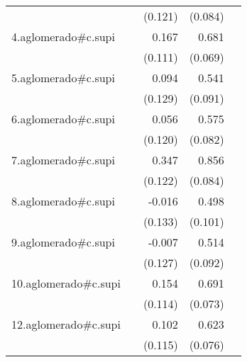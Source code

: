 {\begin{longtable}{l*{4}{D{.}{.}{-1}}}
            &                     &     (0.121)         &     (0.084)         &                     \\
\addlinespace
4.aglomerado#c.supi&                     &       0.167         &       0.681\sym{***}&                     \\
            &                     &     (0.111)         &     (0.069)         &                     \\
\addlinespace
5.aglomerado#c.supi&                     &       0.094         &       0.541\sym{***}&                     \\
            &                     &     (0.129)         &     (0.091)         &                     \\
\addlinespace
6.aglomerado#c.supi&                     &       0.056         &       0.575\sym{***}&                     \\
            &                     &     (0.120)         &     (0.082)         &                     \\
\addlinespace
7.aglomerado#c.supi&                     &       0.347\sym{**} &       0.856\sym{***}&                     \\
            &                     &     (0.122)         &     (0.084)         &                     \\
\addlinespace
8.aglomerado#c.supi&                     &      -0.016         &       0.498\sym{***}&                     \\
            &                     &     (0.133)         &     (0.101)         &                     \\
\addlinespace
9.aglomerado#c.supi&                     &      -0.007         &       0.514\sym{***}&                     \\
            &                     &     (0.127)         &     (0.092)         &                     \\
\addlinespace
10.aglomerado#c.supi&                     &       0.154         &       0.691\sym{***}&                     \\
            &                     &     (0.114)         &     (0.073)         &                     \\
\addlinespace
12.aglomerado#c.supi&                     &       0.102         &       0.623\sym{***}&                     \\
            &                     &     (0.115)         &     (0.076)         &                     \\

\end{longtable}}
